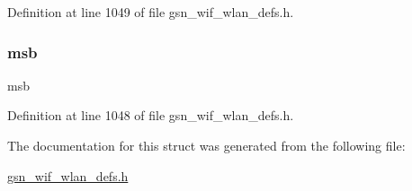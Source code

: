 Definition at line 1049 of file gsn\_\-wif\_\-wlan\_\-defs.h.

\hypertarget{a00407_aa040c0ef636ecd86ef03535060e13c3d}{
\subsubsection[{msb}]{ {\bf msb}}}
\label{a00407_aa040c0ef636ecd86ef03535060e13c3d}
msb 

Definition at line 1048 of file gsn\_\-wif\_\-wlan\_\-defs.h.



The documentation for this struct was generated from the following file:\begin{DoxyCompactItemize}
\item 
\hyperlink{a00613}{gsn\_\-wif\_\-wlan\_\-defs.h}\end{DoxyCompactItemize}
